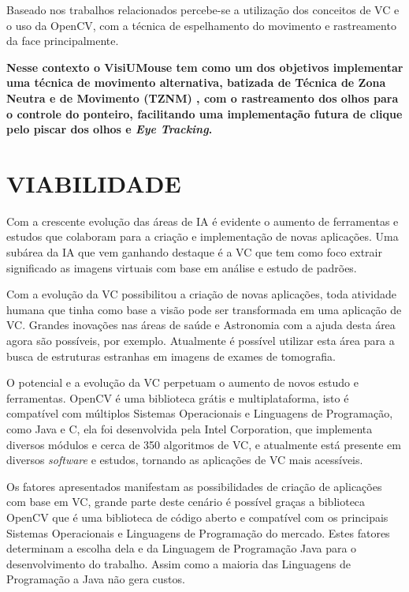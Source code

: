 Baseado nos trabalhos relacionados percebe-se a utilização dos conceitos de VC e o uso da OpenCV, com a técnica de espelhamento do movimento e rastreamento da face principalmente. 



\textbf{Nesse contexto o VisiUMouse tem como um dos objetivos implementar uma técnica de movimento alternativa, batizada de Técnica de Zona Neutra e de Movimento (TZNM) , com o rastreamento dos olhos para o controle do ponteiro, facilitando uma implementação futura de clique pelo piscar dos olhos e \textit{Eye Tracking}.}



\section{VIABILIDADE}\label{Sub:viabilidade}

Com a crescente evolução das áreas de IA é evidente o aumento de ferramentas e estudos que colaboram para a criação e implementação de novas aplicações. Uma subárea da IA que vem ganhando destaque é a VC que tem como foco extrair significado as imagens virtuais com base em análise e estudo de padrões.

Com a evolução da VC possibilitou a criação de novas aplicações, toda atividade humana que tinha como base a visão pode ser transformada em uma aplicação de VC. Grandes inovações nas áreas de saúde e Astronomia com a ajuda desta área agora são possíveis, por exemplo. Atualmente é possível utilizar esta área para a busca de estruturas estranhas em imagens de exames de tomografia. 
    
O potencial e a evolução da VC perpetuam o aumento de novos estudo e ferramentas. OpenCV é uma biblioteca grátis e multiplataforma, isto é compatível com múltiplos Sistemas Operacionais e Linguagens de Programação, como Java e C, ela foi desenvolvida pela Intel Corporation, que implementa diversos módulos e cerca de 350 algoritmos de VC, e atualmente está presente em diversos \textit{software} e estudos, tornando as aplicações de VC mais acessíveis.  

Os fatores apresentados manifestam as possibilidades de criação de aplicações com base em VC, grande parte deste cenário é possível graças a biblioteca OpenCV que é uma biblioteca de código aberto e compatível com os principais Sistemas Operacionais e Linguagens de Programação do mercado. Estes fatores determinam a escolha dela e da Linguagem de Programação Java para o desenvolvimento do trabalho. Assim como a maioria das Linguagens de Programação a Java não gera custos.

